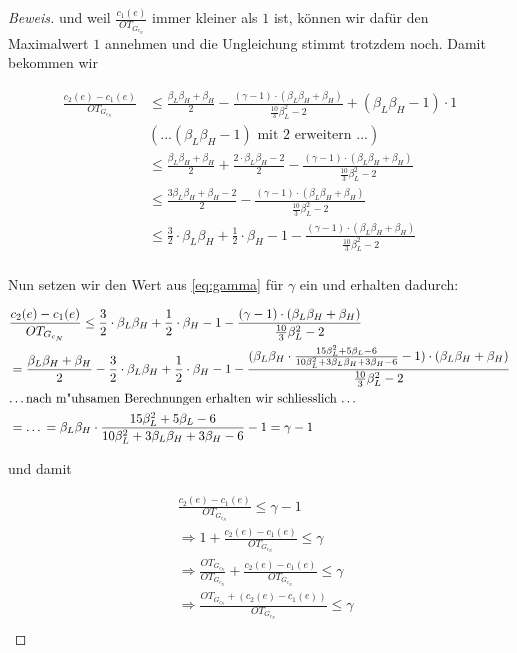 \documentclass[a4paper,11pt]{scrreprt}
\begin{document}
\begin{proof}[Beweis]
und weil $\frac{c_1(e)}{OT_{G_{c_N}}}$ immer kleiner als $1$ ist, können wir dafür den Maximalwert $1$ annehmen und die Ungleichung stimmt trotzdem noch. Damit bekommen wir

\begin{align*}
\frac{c_2(e) - c_1(e)}{OT_{G_{c_N}}} &\le \frac{\beta_L\beta_H + \beta_H}{2} - \frac{(\gamma - 1)\cdot(\beta_L\beta_H + \beta_H)}{\frac{10}{3}\beta_L^2 - 2} + (\beta_L\beta_H - 1) \cdot 1\\
&(\text{...} (\beta_L\beta_H - 1)\text{ mit 2 erweitern ...})\\
&\le \frac{\beta_L\beta_H + \beta_H}{2} + \frac{2\cdot \beta_L\beta_H - 2}{2} - \frac{(\gamma - 1)\cdot(\beta_L\beta_H + \beta_H)}{\frac{10}{3}\beta_L^2 - 2}\\
&\le \frac{3\beta_L\beta_H + \beta_H - 2}{2} - \frac{(\gamma - 1)\cdot(\beta_L\beta_H + \beta_H)}{\frac{10}{3}\beta_L^2 - 2}\\
&\le \frac{3}{2}\cdot\beta_L\beta_H + \frac{1}{2}\cdot\beta_H - 1 - \frac{(\gamma - 1)\cdot(\beta_L\beta_H + \beta_H)}{\frac{10}{3}\beta_L^2 - 2}\\
\end{align*}

Nun setzen wir den Wert aus \ref{eq:gamma} für $\gamma$ ein und erhalten dadurch:

\begin{align*}
&\frac{c_2(e) - c_1(e)}{OT_{G_{c_N}}} \le \frac{3}{2}\cdot\beta_L\beta_H + \frac{1}{2}\cdot\beta_H - 1 - \frac{(\gamma - 1)\cdot(\beta_L\beta_H + \beta_H)}{\frac{10}{3}\beta_L^2 - 2}\\
&= \frac{\beta_L\beta_H + \beta_H}{2} -  \frac{3}{2}\cdot\beta_L\beta_H + \frac{1}{2}\cdot\beta_H - 1 - \frac{(\beta_L\beta_H \cdot \frac{15\beta_L^2 + 5\beta_L - 6}{10\beta_L^2 + 3\beta_L\beta_H + 3\beta_H -6} - 1)\cdot(\beta_L\beta_H + \beta_H)}{\frac{10}{3}\beta_L^2 - 2}\\
&\text{\dots nach m"uhsamen Berechnungen erhalten wir schliesslich \dots}\\
&= \text{\dots} = \beta_L\beta_H \cdot \frac{15\beta_L^2 + 5\beta_L - 6}{10\beta_L^2 + 3\beta_L\beta_H + 3\beta_H -6} - 1 = \gamma - 1
\end{align*}

und damit 


\begin{align*}
&\frac{c_2(e) - c_1(e)}{OT_{G_{c_N}}} \le \gamma - 1\\
&\Rightarrow 1 + \frac{c_2(e) - c_1(e)}{OT_{G_{c_N}}} \le \gamma\\
&\Rightarrow \frac{OT_{G_{c_N}}}{OT_{G_{c_N}}} + \frac{c_2(e) - c_1(e)}{OT_{G_{c_N}}} \le \gamma\\
&\Rightarrow \frac{OT_{G_{c_N}} + (c_2(e) - c_1(e))}{OT_{G_{c_N}}} \le \gamma\\
\end{align*}


\end{proof}
\end{document}
